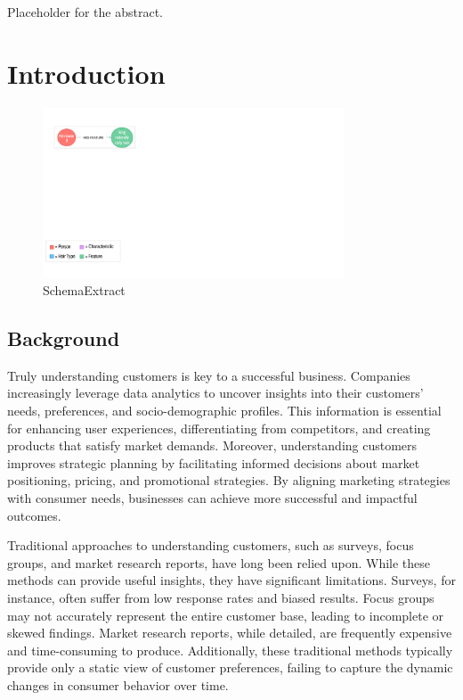 \documentclass[
  letterpaper,
  a4paper,
  12pt,
  titlepage,
  oneside,
  openany]{book}
\begin{document}
Placeholder for the abstract.


\hypertarget{introduction}{%
\chapter{Introduction}\label{introduction}}

\begin{figure}[h!]

{\centering \includegraphics[width=0.8\textwidth,height=\textheight]{assets/SchemaExtract2.gif}

}

\caption{SchemaExtract}

\end{figure}

\hypertarget{background}{%
\section{Background}\label{background}}

Truly understanding customers is key to a successful business. Companies
increasingly leverage data analytics to uncover insights into their
customers' needs, preferences, and socio-demographic profiles. This
information is essential for enhancing user experiences, differentiating
from competitors, and creating products that satisfy market demands.
Moreover, understanding customers improves strategic planning by
facilitating informed decisions about market positioning, pricing, and
promotional strategies. By aligning marketing strategies with consumer
needs, businesses can achieve more successful and impactful outcomes.

Traditional approaches to understanding customers, such as surveys,
focus groups, and market research reports, have long been relied upon.
While these methods can provide useful insights, they have significant
limitations. Surveys, for instance, often suffer from low response rates
and biased results. Focus groups may not accurately represent the entire
customer base, leading to incomplete or skewed findings. Market research
reports, while detailed, are frequently expensive and time-consuming to
produce. Additionally, these traditional methods typically provide only
a static view of customer preferences, failing to capture the dynamic
changes in consumer behavior over time.
\end{document}
